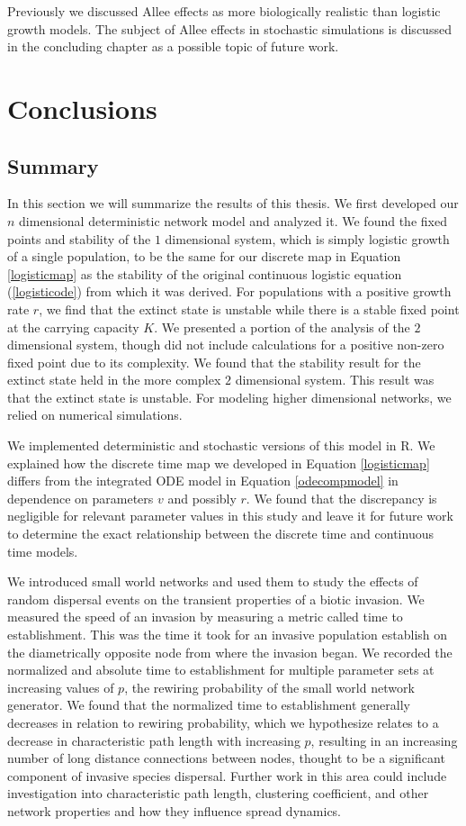 \documentclass[12pt, openany]{book}
\theoremstyle{definition}
\theoremstyle{remark}
\numberwithin{equation}{chapter}
\numberwithin{figure}{chapter}
\begin{document}
Previously we discussed Allee effects as more biologically realistic than logistic growth models. The subject of Allee effects in stochastic simulations is discussed in the concluding chapter as a possible topic of future work.

\chapter{Conclusions}
\section{Summary}
In this section we will summarize the results of this thesis. We first developed our $n$ dimensional deterministic network model and analyzed it. We found the fixed points and stability of the $1$ dimensional system, which is simply logistic growth of a single population, to be the same for our discrete map in Equation \ref{logisticmap} as the stability of the original continuous logistic equation (\ref{logisticode}) from which it was derived. For populations with a positive growth rate $r$, we find that the extinct state is unstable while there is a stable fixed point at the carrying capacity $K$. We presented a portion of the analysis of the $2$ dimensional system, though did not include calculations for a positive non-zero fixed point due to its complexity. We found that the stability result for the extinct state held in the more complex $2$ dimensional system. This result was that the extinct state is unstable. For modeling higher dimensional networks, we relied on numerical simulations.

We implemented deterministic and stochastic versions of this model in R. We explained how the discrete time map we developed in Equation \ref{logisticmap} differs from the integrated ODE model in Equation \ref{odecompmodel} in dependence on parameters $v$ and possibly $r$. We found that the discrepancy is negligible for relevant parameter values in this study and leave it for future work to determine the exact relationship between the discrete time and continuous time models.

We introduced small world networks and used them to study the effects of random dispersal events on the transient properties of a biotic invasion. We measured the speed of an invasion by measuring a metric called time to establishment. This was the time it took for an invasive population establish on the diametrically opposite node from where the invasion began. We recorded the normalized and absolute time to establishment for multiple parameter sets at increasing values of $p$, the rewiring probability of the small world network generator. We found that the normalized time to establishment generally decreases in relation to rewiring probability, which we hypothesize relates to a decrease in characteristic path length with increasing $p$, resulting in an increasing number of long distance connections between nodes, thought to be a significant component of invasive species dispersal. Further work in this area could include investigation into characteristic path length, clustering coefficient, and other network properties and how they influence spread dynamics.
\end{document}
